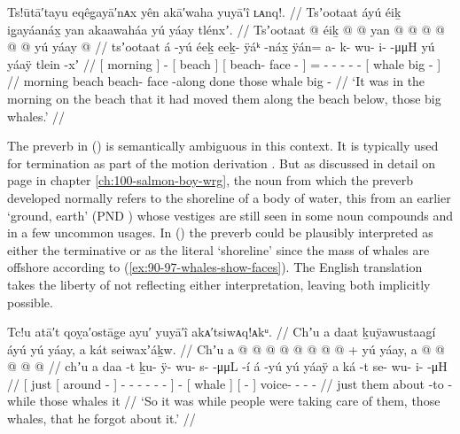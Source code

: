 \ex\label{ex:90-99-move-whales-along-beach}%
%
\begingl
	\glpreamble	Ts!ūtā′tayu eqêg̣ayā′nᴀx yên akā′waha yuyā′î ʟᴀnq!. //
	\glpreamble	Tsʼootaat áyú éiḵ ig̱ayáanáx̱ yan akaawaháa yú yáay tlénxʼ. //
	\gla	{} Tsʼootaat {}  @ {}
		{} éiḵ {}
		{}  @ {} @ {} {}
		yan @  @ {} @ {} @ {} @ {} @ {}
		{} yú yáay  @ {} {} //
	\glb	{} tsʼootaat {} á -yú
		{} éeḵ {}
		{} eeḵ- ÿáᵏ -náx̱ {}
		ÿán= a- k- wu- i-  -μμH
		{} yú yáaÿ tlein -xʼ {} //
	\glc	{}[ morning {}]  -
		{}[ beach {}]
		{}[ beach- face - {}]
		= - - - -  -
		{}[  whale big - {}] //
	\gld	{} morning {}  {}
		{} beach {}
		{} beach- face -along {}
		done\•  {} {} {} {} {}
		{} those whale big - {} //
	\glft	‘It was in the morning on the beach that it had moved them along the beach below,
		those big whales.’
		//
\endgl
\xe

The preverb  in (\lastx) is semantically ambiguous in this context.
It is typically used for termination as part of the motion derivation .
But as discussed in detail on page \pageref{note:100-shore-discussion} in chapter \ref{ch:100-salmon-boy-wrg}, the noun  from which the preverb developed normally refers to the shoreline of a body of water, this from an earlier  ‘ground, earth’ (PND ) whose vestiges are still seen in some noun compounds and in a few uncommon usages.
In (\lastx) the  preverb could be plausibly interpreted as either the terminative or as the literal ‘shoreline’ since the mass of whales are offshore according to (\ref{ex:90-97-whales-show-faces}).
The English translation takes the liberty of not reflecting either interpretation, leaving both implicitly possible.

\ex\label{ex:90-100-while-busy-forgot}%
%
\begingl
	\glpreamble	Tc!u atā′t qoỵa′ostāg̣e ayu′ yuyā′î akᴀ′tsiwᴀq!ᴀkᵘ. //
	\glpreamble	Chʼu a daat ḵuÿawustaag̱í áyú yú yáay, a kát seiwaxʼáḵw. //
	\gla	{} Chʼu {} a  @ {} {}
			 @ {} @ {} @ {} @ {} @ {} @ {} {}
		 @ {} +
		{} yú yáay, {}
		{} a  @ {} {}
		 @ {} @ {} @ {} @ {} //
	\glb	{} chʼu {} a daa -t {}
			ḵu- ÿ- wu- s-  -μμL -í {}
		á -yú
		{} yú yáaÿ {}
		{} a ká -t {}
		se- wu- i-  -μH //
	\glc	{}[ just {}[  around - {}]
			- - - -  - - {}]
		 -
		{}[  whale {}]
		{}[   - {}]
		voice- - -  - //
	\gld	{} just {} them about -to {}
			 {} {} {} {} {} -while {}
		 {}
		{} those whales {}
		{} it  {} {}
		 {} {} {} {} //
	\glft	‘So it was while people were taking care of them, those whales, that he forgot about it.’
		//
\endgl
\xe

